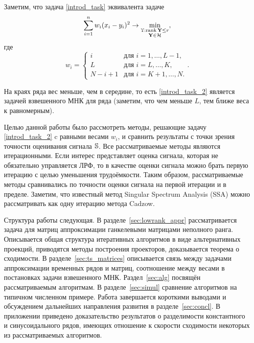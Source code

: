 \documentclass[12pt,a4paper,fleqn,leqno]{article}
\def\rank{\mathop{\mathrm{rank}}}
\begin{document}
Заметим, что задача \eqref{introd_task} эквивалента задаче
\begin{equation}\label{introd_task_2}
\sum_{i = 1}^n w_i(x_i - y_i)^2 \to \min_{\substack{\tsY: \rank \bfY \le r \\ \bfY \in \calH}},
\end{equation}
где
\begin{equation}
\label{eq:w}
w_i = \begin{cases}
i & \text{для $i = 1, \ldots, L-1,$}\\
L & \text{для $i = L, \ldots, K,$}\\
N - i + 1 & \text{для $i = K + 1, \ldots, N.$}
\end{cases}.
\end{equation}

На краях ряда вес меньше, чем в середине, то есть \eqref{introd_task_2} является задачей взвешенного МНК для ряда (заметим, что чем меньше $L$, тем ближе веса к равномерным).

Целью данной работы было рассмотреть методы, решающие задачу \eqref{introd_task_2} c равными весами $w_i$, и сравнить результаты с точки зрения точности оценивания сигнала $\mathbb{S}$. Все рассматриваемые методы являются итерационными. Если интерес представляет оценка сигнала, которая не обязательно управляется ЛРФ, то в качестве оценки сигнала можно брать первую итерацию с целью уменьшения трудоёмкости. Таким образом, рассматриваемые методы сравнивались по точности оценки сигнала на первой итерации и в пределе. Заметим, что известный метод Singular Spectrum Analysis (SSA) \cite{Broomhead.King1986, Vautard.etal1992, Elsner.Tsonis1996, Golyandina.etal2001, Ghil.etal2002, Golyandina.Zhigljavsky2012} можно
рассматривать как одну итерацию метода Cadzow.

Структура работы следующая.  В разделе~\ref{sec:lowrank_appr} рассматривается задача для матриц аппроксимации ганкелевыми матрицами неполного ранга. 
Описывается общая структура итеративных алгоритмов в виде альтернативных проекций, приводятся методы построения проекторов, доказывается теорема о сходимости.
В разделе~\ref{sec:ts_matrices} описывается связь между задачами аппроксимации временных рядов и матриц, соотношение между весами в постановках задачи 
взвешенного МНК. Раздел~\ref{sec:alg} посвящён рассматриваемым алгоритмам. В разделе~\ref{sec:simul} сравнение алгоритмов на типичном численном примере.
Работа завершается короткими выводами и обсуждением дальнейших направления развития в разделе~\ref{sec:concl}. В приложении приведено доказательство результатов
о разделимости константного и синусоидального рядов, имеющих отношение к скорости сходимости некоторых из рассматриваемых алгоритмов.
\end{document}
